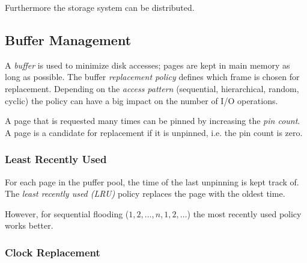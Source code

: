 Furthermore the storage system can be distributed.





\subsection{Buffer Management}

A \emph{buffer} is used to minimize disk accesses; pages are kept in main memory as long as possible. The buffer \emph{replacement policy} defines which frame is chosen for replacement. Depending on the \emph{access pattern} (sequential, hierarchical, random, cyclic) the policy can have a big impact on the number of I/O operations.

A page that is requested many times can be pinned by increasing the \emph{pin count}. A page is a candidate for replacement if it is unpinned, i.e. the pin count is zero.





\subsubsection{Least Recently Used}

For each page in the puffer pool, the time of the last unpinning is kept track of. The \emph{least recently used (LRU)} policy replaces the page with the oldest time.

\begin{note}
However, for sequential flooding ($1,2,\ldots,n,1,2,\ldots$) the most recently used policy works better.
\end{note}




\subsubsection{Clock Replacement}


